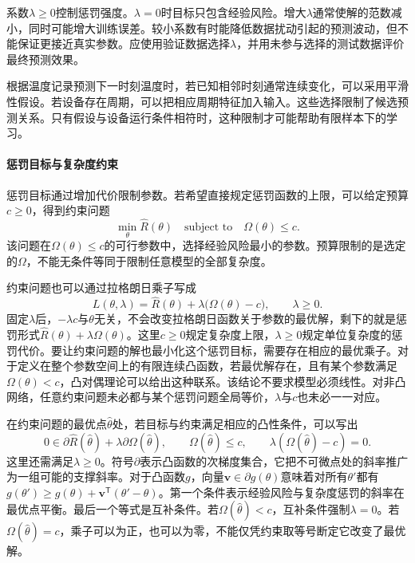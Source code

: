 系数$\lambda\geq0$控制惩罚强度。$\lambda=0$时目标只包含经验风险。增大$\lambda$通常使解的范数减小，同时可能增大训练误差。较小系数有时能降低数据扰动引起的预测波动，但不能保证更接近真实参数。应使用验证数据选择$\lambda$，并用未参与选择的测试数据评价最终预测效果。

\begin{example}
 根据温度记录预测下一时刻温度时，若已知相邻时刻通常连续变化，可以采用平滑性假设。若设备存在周期，可以把相应周期特征加入输入。这些选择限制了候选预测关系。只有假设与设备运行条件相符时，这种限制才可能帮助有限样本下的学习。
\end{example}

\paragraph{惩罚目标与复杂度约束}
惩罚目标通过增加代价限制参数。若希望直接规定惩罚函数的上限，可以给定预算$c\geq0$，得到约束问题
\begin{equation}
 \min_{\theta}\hat R(\theta)\quad\text{subject to}\quad \Omega(\theta)\leq c.
\end{equation}
该问题在$\Omega(\theta)\leq c$的可行参数中，选择经验风险最小的参数。预算限制的是选定的$\Omega$，不能无条件等同于限制任意模型的全部复杂度。

约束问题也可以通过拉格朗日乘子写成
\begin{equation}
 L(\theta,\lambda)=\hat R(\theta)+\lambda\bigl(\Omega(\theta)-c\bigr),\qquad \lambda\geq0.
\end{equation}
固定$\lambda$后，$-\lambda c$与$\theta$无关，不会改变拉格朗日函数关于参数的最优解，剩下的就是惩罚形式$\hat R(\theta)+\lambda\Omega(\theta)$。这里$c\geq0$规定复杂度上限，$\lambda\geq0$规定单位复杂度的惩罚代价。要让约束问题的解也最小化这个惩罚目标，需要存在相应的最优乘子。对于定义在整个参数空间上的有限连续凸函数，若最优解存在，且有某个参数满足$\Omega(\theta)<c$，凸对偶理论可以给出这种联系。该结论不要求模型必须线性。对非凸网络，任意约束问题未必都与某个惩罚问题全局等价，$\lambda$与$c$也未必一一对应。

在约束问题的最优点$\hat\theta$处，若目标与约束满足相应的凸性条件，可以写出
\begin{equation}
 0\in\partial\hat R(\hat\theta)+\lambda\partial\Omega(\hat\theta),\qquad
 \Omega(\hat\theta)\leq c,\qquad
 \lambda(\Omega(\hat\theta)-c)=0.
\end{equation}
这里还需满足$\lambda\geq0$。符号$\partial$表示凸函数的次梯度集合，它把不可微点处的斜率推广为一组可能的支撑斜率。对于凸函数$g$，向量$\bm v\in\partial g(\theta)$意味着对所有$\theta'$都有$g(\theta')\geq g(\theta)+\bm v^{\mathsf T}(\theta'-\theta)$。第一个条件表示经验风险与复杂度惩罚的斜率在最优点平衡。最后一个等式是互补条件。若$\Omega(\hat\theta)<c$，互补条件强制$\lambda=0$。若$\Omega(\hat\theta)=c$，乘子可以为正，也可以为零，不能仅凭约束取等号断定它改变了最优解。

